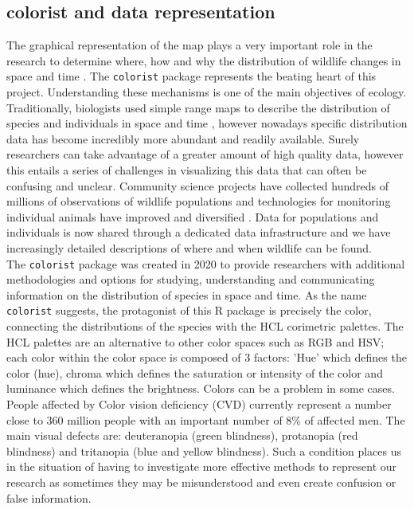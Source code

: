 \documentclass[12pt,a4paper]{article}
\begin{document}
\subsection{colorist and data representation}
The graphical representation of the map plays a very important role in the research to determine where, how and why the distribution of wildlife changes in space and time \citep{colo}.
The \texttt{colorist} package represents the beating heart of this project.
Understanding these mechanisms is one of the main objectives of ecology.\citep{and1}
Traditionally, biologists used simple range maps to describe the distribution of species and individuals in space and time \citep{brt} \citep{gri}, however nowadays specific distribution data has become incredibly more abundant and readily available.
Surely researchers can take advantage of a greater amount of high quality data, however this entails a series of challenges in visualizing this data that can often be confusing and unclear.\citep{colo}
Community science projects have collected hundreds of millions of observations of wildlife populations \citep{nat} \citep{sal} and technologies for monitoring individual animals have improved and diversified \citep{ks}. Data for populations and individuals is now shared through a dedicated data infrastructure \citep{gbif} \citep{kra} and we have increasingly detailed descriptions of where and when wildlife can be found.\\
The \texttt{colorist} package was created in 2020 \citep{colo} to provide researchers with additional methodologies and options for studying, understanding and communicating information on the distribution of species in space and time.
As the name \texttt{colorist} suggests, the protagonist of this R package is precisely the color, connecting the distributions of the species with the HCL corimetric palettes.
The HCL palettes are an alternative to other color spaces such as RGB and HSV; each color within the color space is composed of 3 factors: 'Hue' which defines the color (hue), chroma which defines the saturation or intensity of the color and luminance which defines the brightness.
Colors can be a problem in some cases. People affected by Color vision deficiency (CVD) currently represent a number close to 360 million people with an important number of 8\% of affected men. The main visual defects are: deuteranopia (green blindness), protanopia (red blindness) and tritanopia (blue and yellow blindness).
Such a condition places us in the situation of having to investigate more effective methods to represent our research as sometimes they may be misunderstood and even create confusion or false information.
\end{document}
